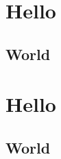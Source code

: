 \documentclass[a4paper,12pt]{scrreprt}
\begin{document}
\chapter{Hello}
\section{World}
 
\blindtext[10]
 
 
 \chapter{Hello}
\section{World}
 
\blindtext[10]
 
\end{document}
